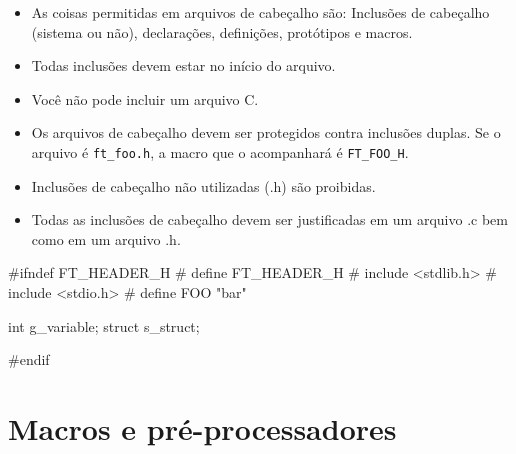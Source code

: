 \documentclass{42-pt}
\begin{document}
        \begin{itemize}

            \item As coisas permitidas em arquivos de cabeçalho são:
                Inclusões de cabeçalho (sistema ou não), declarações, definições,
                protótipos e macros.

            \item Todas inclusões devem estar no início do arquivo.

            \item Você não pode incluir um arquivo C.

            \item Os arquivos de cabeçalho devem ser protegidos contra inclusões
             duplas. Se o arquivo é \texttt{ft\_foo.h}, a macro que o acompanhará
             é \texttt{FT\_FOO\_H}.

            \item Inclusões de cabeçalho não utilizadas (.h) são proibidas.

            \item Todas as inclusões de cabeçalho devem ser justificadas em um arquivo .c
                bem como em um arquivo .h.

        \end{itemize}

        \begin{42ccode}
#ifndef FT_HEADER_H
# define FT_HEADER_H
# include <stdlib.h>
# include <stdio.h>
# define FOO "bar"

int g_variable;
struct s_struct;

#endif
        \end{42ccode}
        \newpage

    \section{Macros e pré-processadores}
\end{document}
